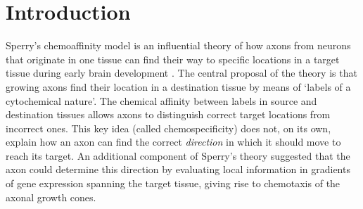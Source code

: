 \documentclass[11pt, a4paper]{article}
\begin{document}

\section{Introduction}


Sperry's chemoaffinity model is an influential theory of how axons from neurons that originate in one tissue can find their way to specific locations in a target tissue during early brain development \citep{sperry_reestablishment_1942,sperry_visuomotor_1943,sperry_chemoaffinity_1963}.
%
The central proposal of the theory is that growing axons find their location in a destination tissue by means of `labels of a cytochemical nature'. 
The chemical affinity between labels in source and destination tissues allows axons to distinguish correct target locations from incorrect ones. 
%
This key idea (called chemospecificity) does not, on its own, explain how an axon can find the correct \emph{direction} in which it should move to reach its target.  
An additional component of Sperry's theory \citep{stevens_handbook_1950,sperry_problems_1955,sperry_chemoaffinity_1963} suggested that the axon could determine this direction by evaluating local information in gradients of gene expression spanning the target tissue, giving rise to chemotaxis of the axonal growth cones.
\end{document}
